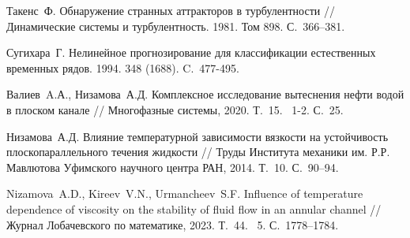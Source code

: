 \begin{thebibliography}{9} %
 Такенс~Ф. Обнаружение странных аттракторов в турбулентности // Динамические системы и турбулентность. 1981. Том 898. С.~366--381.

 Сугихара~Г. Нелинейное прогнозирование для классификации естественных временных рядов.  1994. 348 (1688). C.~477-495.


	Валиев~A.А., Низамова~А.Д. Комплексное исследование вытеснения нефти водой в плоском канале // Многофазные системы, 2020. Т.~15. \textnumero~1-2. С.~25.

	Низамова~А.Д. Влияние температурной зависимости вязкости на устойчивость плоскопараллельного течения жидкости // Труды Института механики им. Р.Р. Мавлютова Уфимского научного центра РАН, 2014. Т.~10. С.~90--94.

	Nizamova~A.D., Kireev~V.N., Urmancheev~S.F. Influence of temperature dependence of viscosity on the stability of fluid flow in an annular channel // Журнал Лобачевского по математике, 2023. Т.~44. \textnumero~5. С.~1778--1784.
\end{thebibliography}




%

